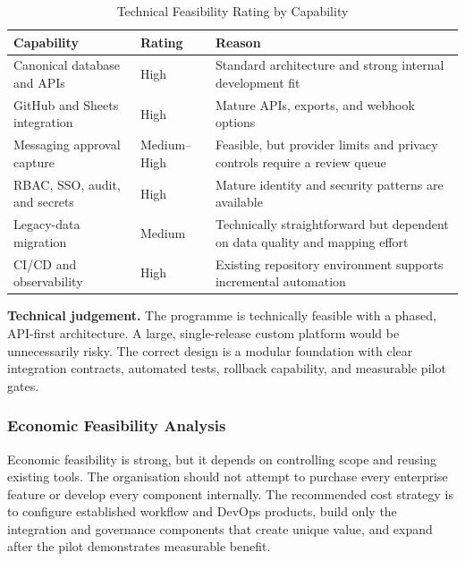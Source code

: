 \documentclass[12pt,a4paper]{report}
\begin{document}
\begin{table}[H]
\centering
\caption{Technical Feasibility Rating by Capability}
\label{tab:technical-feasibility}
\small
\renewcommand{\arraystretch}{1.22}
\begin{tabularx}{\textwidth}{>{\raggedright\arraybackslash}p{4.0cm}
                                >{\centering\arraybackslash}p{2.0cm}
                                >{\raggedright\arraybackslash}X}
\toprule
\textbf{Capability} & \textbf{Rating} & \textbf{Reason} \\
\midrule
Canonical database and APIs & High & Standard architecture and strong internal development fit \\
GitHub and Sheets integration & High & Mature APIs, exports, and webhook options \\
Messaging approval capture & Medium--High & Feasible, but provider limits and privacy controls require a review queue \\
RBAC, SSO, audit, and secrets & High & Mature identity and security patterns are available \\
Legacy-data migration & Medium & Technically straightforward but dependent on data quality and mapping effort \\
CI/CD and observability & High & Existing repository environment supports incremental automation \\
\bottomrule
\end{tabularx}
\end{table}

\textbf{Technical judgement.}
The programme is technically feasible with a phased, API-first architecture. A large, single-release
custom platform would be unnecessarily risky. The correct design is a modular foundation with
clear integration contracts, automated tests, rollback capability, and measurable pilot gates.

\subsubsection{Economic Feasibility Analysis}\label{sec:feas-economic}

Economic feasibility is strong, but it depends on controlling scope and reusing existing tools.
The organisation should not attempt to purchase every enterprise feature or develop every
component internally. The recommended cost strategy is to configure established workflow and
DevOps products, build only the integration and governance components that create unique value,
and expand after the pilot demonstrates measurable benefit.
\end{document}
